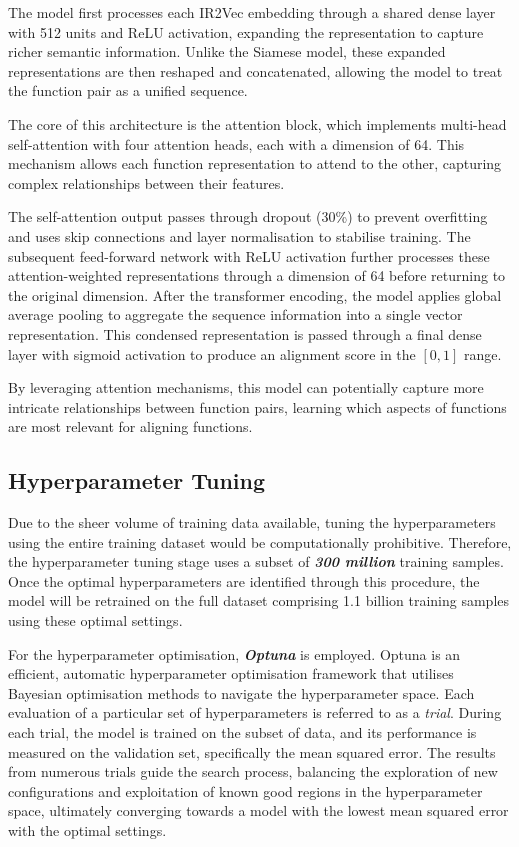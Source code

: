 The model first processes each IR2Vec embedding through a shared dense layer with 512 units and ReLU activation, expanding the representation to capture richer semantic information. Unlike the Siamese model, these expanded representations are then reshaped and concatenated, allowing the model to treat the function pair as a unified sequence.

The core of this architecture is the attention block, which implements multi-head self-attention with four attention heads, each with a dimension of 64. This mechanism allows each function representation to attend to the other, capturing complex relationships between their features. 

The self-attention output passes through dropout (30\%) to prevent overfitting and uses skip connections and layer normalisation to stabilise training. The subsequent feed-forward network with ReLU activation further processes these attention-weighted representations through a dimension of 64 before returning to the original dimension. After the transformer encoding, the model applies global average pooling to aggregate the sequence information into a single vector representation. This condensed representation is passed through a final dense layer with sigmoid activation to produce an alignment score in the $[0,1]$ range.

By leveraging attention mechanisms, this model can potentially capture more intricate relationships between function pairs, learning which aspects of functions are most relevant for aligning functions.


\subsection{Hyperparameter Tuning} \label{subsubsection:HyperparameterTuning}
Due to the sheer volume of training data available, tuning the hyperparameters using the entire training dataset would be computationally prohibitive. Therefore, the hyperparameter tuning stage uses a subset of \textbf{\textit{300 million}} training samples. Once the optimal hyperparameters are identified through this procedure, the model will be retrained on the full dataset comprising 1.1 billion training samples using these optimal settings.

For the hyperparameter optimisation, \textbf{\textit{Optuna}} is employed. Optuna is an efficient, automatic hyperparameter optimisation framework that utilises Bayesian optimisation methods to navigate the hyperparameter space. Each evaluation of a particular set of hyperparameters is referred to as a \emph{trial}. During each trial, the model is trained on the subset of data, and its performance is measured on the validation set, specifically the mean squared error. The results from numerous trials guide the search process, balancing the exploration of new configurations and exploitation of known good regions in the hyperparameter space, ultimately converging towards a model with the lowest mean squared error with the optimal settings.

